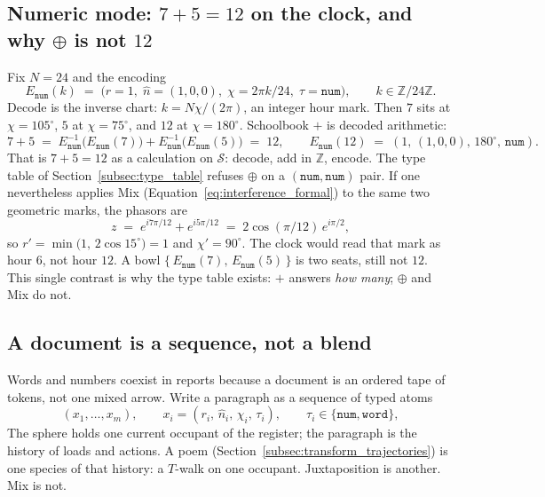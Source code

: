 \documentclass[12pt, a4paper]{article}
\begin{document}
\subsection{Numeric mode: $7+5=12$ on the clock, and why $\oplus$ is not $12$}
\label{subsec:clock_encoding}
Fix $N=24$ and the encoding
\begin{equation}
    E_{\mathtt{num}}(k)
    \;=\;
    \bigl(r=1,\;\hat n=(1,0,0),\;\chi=2\pi k/24,\;\tau=\mathtt{num}\bigr),
    \qquad
    k\in\mathbb{Z}/24\mathbb{Z}.
    \label{eq:clock_encoding}
\end{equation}
Decode is the inverse chart: $k = N\chi/(2\pi)$, an integer hour mark.
Then $7$ sits at $\chi=105^\circ$, $5$ at $\chi=75^\circ$, and $12$ at
$\chi=180^\circ$. Schoolbook $+$ is decoded arithmetic:
\begin{equation}
    7+5
    \;=\;
    E_{\mathtt{num}}^{-1}\bigl(E_{\mathtt{num}}(7)\bigr)
    +
    E_{\mathtt{num}}^{-1}\bigl(E_{\mathtt{num}}(5)\bigr)
    \;=\; 12,
    \qquad
    E_{\mathtt{num}}(12)
    \;=\;
    (1,\,(1,0,0),\,180^\circ,\,\mathtt{num}).
\end{equation}
That is $7+5=12$ as a calculation on $\mathcal{S}$: decode, add in
$\mathbb{Z}$, encode. The type table of
Section~\ref{subsec:type_table} refuses $\oplus$ on a
$(\mathtt{num},\mathtt{num})$ pair. If one nevertheless applies Mix
(Equation~\eqref{eq:interference_formal}) to the same two geometric
marks, the phasors are
\begin{equation}
    z
    \;=\;
    e^{i 7\pi/12} + e^{i 5\pi/12}
    \;=\;
    2\cos(\pi/12)\,e^{i\pi/2},
\end{equation}
so $r'=\min\bigl(1,\,2\cos 15^\circ\bigr)=1$ and $\chi'=90^\circ$.
The clock would read that mark as hour $6$, not hour $12$.
A bowl $\{\,E_{\mathtt{num}}(7),\,E_{\mathtt{num}}(5)\,\}$ is two seats,
still not $12$. This single contrast is why the type table exists:
$+$ answers \emph{how many}; $\oplus$ and Mix do not.

\subsection{A document is a sequence, not a blend}
\label{subsec:document_sequence}
Words and numbers coexist in reports because a document is an ordered
tape of tokens, not one mixed arrow. Write a paragraph as a sequence
of typed atoms
\begin{equation}
    (x_1,\ldots,x_m),
    \qquad
    x_i=(r_i,\,\hat n_i,\,\chi_i,\,\tau_i),
    \qquad
    \tau_i\in\{\mathtt{num},\mathtt{word}\},
    \label{eq:mixed_document}
\end{equation}
The sphere holds one current occupant of the register; the paragraph is the history of
loads and actions. A poem
(Section~\ref{subsec:transform_trajectories}) is one species of that
history: a $T$-walk on one occupant. Juxtaposition is another. Mix is
not.
\end{document}
